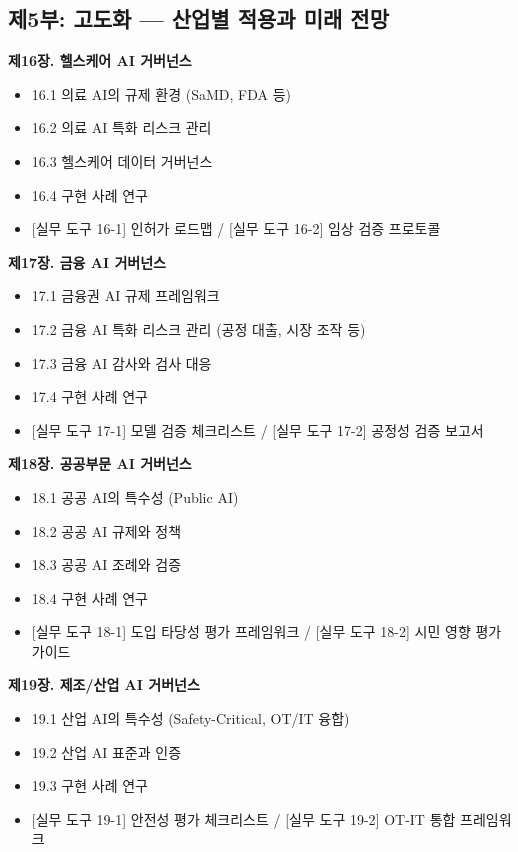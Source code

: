 \vspace{0.5cm}
\subsection*{제5부: 고도화 --- 산업별 적용과 미래 전망}

\textbf{제16장. 헬스케어 AI 거버넌스}
\begin{itemize}
 \item 16.1 의료 AI의 규제 환경 (SaMD, FDA 등)
 \item 16.2 의료 AI 특화 리스크 관리
 \item 16.3 헬스케어 데이터 거버넌스
 \item 16.4 구현 사례 연구
 \item {[실무 도구 16-1] 인허가 로드맵} / {[실무 도구 16-2] 임상 검증 프로토콜}
\end{itemize}

\medskip
\textbf{제17장. 금융 AI 거버넌스}
\begin{itemize}
 \item 17.1 금융권 AI 규제 프레임워크
 \item 17.2 금융 AI 특화 리스크 관리 (공정 대출, 시장 조작 등)
 \item 17.3 금융 AI 감사와 검사 대응
 \item 17.4 구현 사례 연구
 \item {[실무 도구 17-1] 모델 검증 체크리스트} / {[실무 도구 17-2] 공정성 검증 보고서}
\end{itemize}

\medskip
\textbf{제18장. 공공부문 AI 거버넌스}
\begin{itemize}
 \item 18.1 공공 AI의 특수성 (Public AI)
 \item 18.2 공공 AI 규제와 정책
 \item 18.3 공공 AI 조례와 검증
 \item 18.4 구현 사례 연구
 \item {[실무 도구 18-1] 도입 타당성 평가 프레임워크} / {[실무 도구 18-2] 시민 영향 평가 가이드}
\end{itemize}

\medskip
\textbf{제19장. 제조/산업 AI 거버넌스}
\begin{itemize}
 \item 19.1 산업 AI의 특수성 (Safety-Critical, OT/IT 융합)
 \item 19.2 산업 AI 표준과 인증
 \item 19.3 구현 사례 연구
 \item {[실무 도구 19-1] 안전성 평가 체크리스트} / {[실무 도구 19-2] OT-IT 통합 프레임워크}
\end{itemize}

